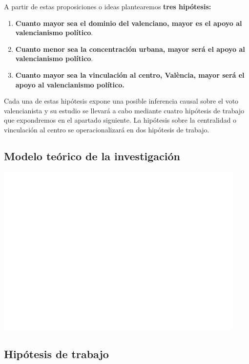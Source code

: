 \documentclass[
]{article}
\begin{document}
A partir de estas proposiciones o ideas plantearemos \textbf{tres
hipótesis:}

\begin{enumerate}
\def\labelenumi{\arabic{enumi}.}
\item
  \textbf{Cuanto mayor sea el dominio del valenciano, mayor es el apoyo
  al valencianismo político}.
\item
  \textbf{Cuanto menor sea la concentración urbana, mayor será el apoyo
  al valencianismo político}.
\item
  \textbf{Cuanto mayor sea la vinculación al centro, València, mayor
  será el apoyo al valencianismo político.}
\end{enumerate}

Cada una de estas hipótesis expone una posible inferencia causal sobre
el voto valencianista y su estudio se llevará a cabo mediante cuatro
hipótesis de trabajo que expondremos en el apartado siguiente. La
hipótesis sobre la centralidad o vinculación al centro se
operacionalizará en dos hipótesis de trabajo.

\hypertarget{modelo-teuxf3rico-de-la-investigaciuxf3n}{%
\subsection{Modelo teórico de la
investigación}\label{modelo-teuxf3rico-de-la-investigaciuxf3n}}

\includegraphics{votovalencianista-ea2023_page_files/figure-latex/modelo-1.png}

\hypertarget{hipuxf3tesis-de-trabajo}{%
\subsection{Hipótesis de trabajo}\label{hipuxf3tesis-de-trabajo}}
\end{document}
